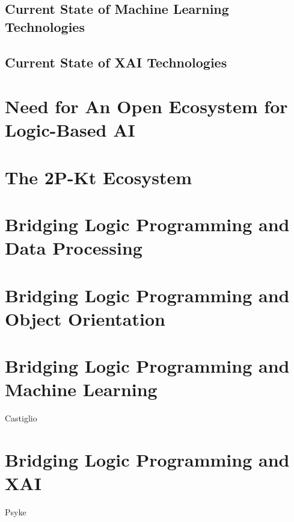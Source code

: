\documentclass[12pt,a4paper,openright,twoside]{book}
\begin{document}
\cite{lptech4mas-aamas2021}
\cite{lptech4mas-jaamas35}
\cite{logictech-information11}

\section{Current State of Machine Learning Technologies}

\section{Current State of XAI Technologies}

\cite{xaisurvey-ia14}

\chapter{Need for An Open Ecosystem for Logic-Based AI}

\cite{cco-softwarex-2021-2pkt}

\chapter{The 2P-Kt Ecosystem}

\cite{cco-softwarex-2021-2pkt}
\cite{kotlindsi4prolog-woa2020}

\chapter{Bridging Logic Programming and Data Processing}

\cite{2pkt-jelia2021}

\chapter{Bridging Logic Programming and Object Orientation}

\cite{cco-softwarex-2021-2pkt}
\cite{kotlindsi4prolog-woa2020}

\chapter{Bridging Logic Programming and Machine Learning}

Castiglio

\chapter{Bridging Logic Programming and XAI}

Psyke
\end{document}
